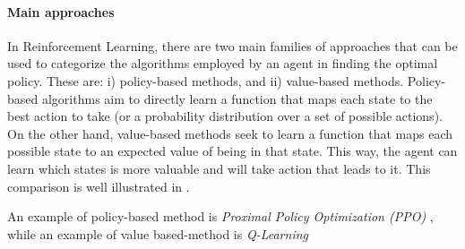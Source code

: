 \documentclass[12pt,a4paper,openright,twoside]{book}
\begin{document}
\paragraph{Main approaches}

In Reinforcement Learning, there are two main families of approaches that can be used to categorize the 
    algorithms employed by an agent in finding the optimal policy. These are: 
    i) policy-based methods, and 
    ii) value-based methods.
    Policy-based algorithms aim to directly learn a function that maps each state to the best action to take 
    (or a probability distribution over a set of possible actions). On the other hand, value-based methods 
    seek to learn a function that maps each possible state to an expected value of being in that state. 
    This way, the agent can learn which states is more valuable and will take action that leads to it. 
    This comparison is well illustrated in .

An example of policy-based method is \emph{Proximal Policy Optimization (PPO)} \cite{ppo}, while an example of 
    value based-method is \emph{Q-Learning} \cite{QL}
\end{document}
